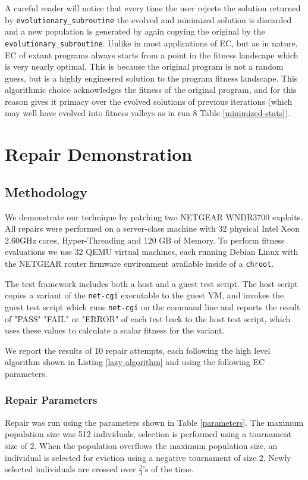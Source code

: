 \documentclass{sigcomm-alternate}
\begin{document}
A careful reader will notice that every time the user rejects the
solution returned by \texttt{evolutionary\_subroutine} the evolved and
minimized solution is discarded and a new population is generated by
again copying the original by the \texttt{evolutionary\_subroutine}.  Unlike
in most applications of EC, but as in nature, EC of extant programs
always starts from a point in the fitness landscape which is very
nearly optimal.  This is because the original program is not a random
guess, but is a highly engineered solution to the program fitness
landscape.  This algorithmic choice acknowledges the fitness of the
original program, and for this reason gives it primacy over the
evolved solutions of previous iterations (which may well have evolved
into fitness valleys as in run 8 Table \ref{minimized-stats}).
\section{Repair Demonstration}
\label{sec-4}
\subsection{Methodology}
\label{sec-4-1}
We demonstrate our technique by patching two NETGEAR WNDR3700
exploits.  All repairs were performed on a server-class machine with
32 physical Intel Xeon 2.60GHz cores, Hyper-Threading and 120 GB of
Memory.  To perform fitness evaluations we use 32 QEMU virtual
machines, each running Debian Linux with the NETGEAR router firmware
environment available inside of a \texttt{chroot}.

The test framework includes both a host and a guest test script.  The
host script copies a variant of the \texttt{net-cgi} executable to the guest
VM, and invokes the guest test script which runs \texttt{net-cgi} on the
command line and reports the result of "PASS" "FAIL" or "ERROR" of
each test back to the host test script, which uses these values to
calculate a scalar fitness for the variant.

We report the results of 10 repair attempts, each following the high
level algorithm shown in Listing \ref{lazy-algorithm} and using the
following EC parameters.

\subsubsection{Repair Parameters}
\label{sec-4-1-1}
Repair was run using the parameters shown in Table \ref{parameters}.  The
maximum population size was 512 individuals, selection is performed
using a tournament size of 2.  When the population overflows the
maximum population size, an individual is selected for eviction using
a negative tournament of size 2.  Newly selected individuals are
crossed over $\frac{2}{3}$'s of the time.
\end{document}
